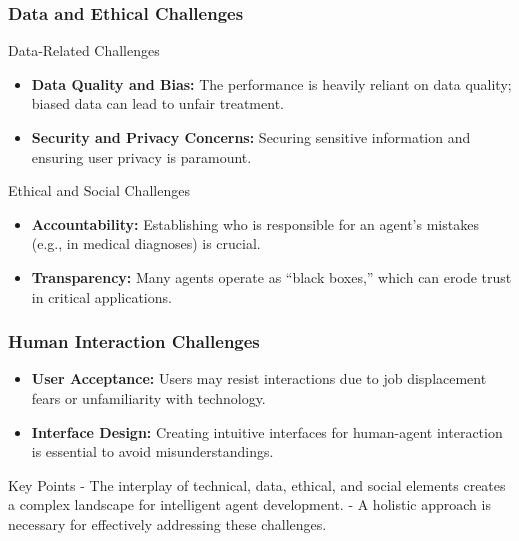 \documentclass[aspectratio=169]{beamer}
\begin{document}
\begin{frame}[fragile]
    \frametitle{Data and Ethical Challenges}
    \begin{block}{Data-Related Challenges}
        \begin{itemize}
            \item \textbf{Data Quality and Bias:} The performance is heavily reliant on data quality; biased data can lead to unfair treatment.
            
            \item \textbf{Security and Privacy Concerns:} Securing sensitive information and ensuring user privacy is paramount.
        \end{itemize}
    \end{block}

    \begin{block}{Ethical and Social Challenges}
        \begin{itemize}
            \item \textbf{Accountability:} Establishing who is responsible for an agent's mistakes (e.g., in medical diagnoses) is crucial.
            
            \item \textbf{Transparency:} Many agents operate as “black boxes,” which can erode trust in critical applications.
        \end{itemize}
    \end{block}
\end{frame}

\begin{frame}[fragile]
    \frametitle{Human Interaction Challenges}
    \begin{itemize}
        \item \textbf{User Acceptance:} Users may resist interactions due to job displacement fears or unfamiliarity with technology.
        
        \item \textbf{Interface Design:} Creating intuitive interfaces for human-agent interaction is essential to avoid misunderstandings.
    \end{itemize}
    
    \begin{block}{Key Points}
        - The interplay of technical, data, ethical, and social elements creates a complex landscape for intelligent agent development.
        - A holistic approach is necessary for effectively addressing these challenges.
    \end{block}
\end{frame}
\end{document}
